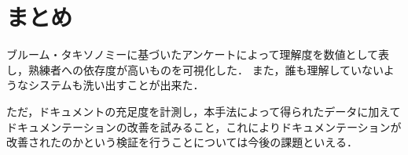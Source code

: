\section{まとめ}
ブルーム・タキソノミーに基づいたアンケートによって理解度を数値として表し，熟練者への依存度が高いものを可視化した．
また，誰も理解していないようなシステムも洗い出すことが出来た．

ただ，ドキュメントの充足度を計測し，本手法によって得られたデータに加えてドキュメンテーションの改善を試みること，これによりドキュメンテーションが改善されたのかという検証を行うことについては今後の課題といえる．

